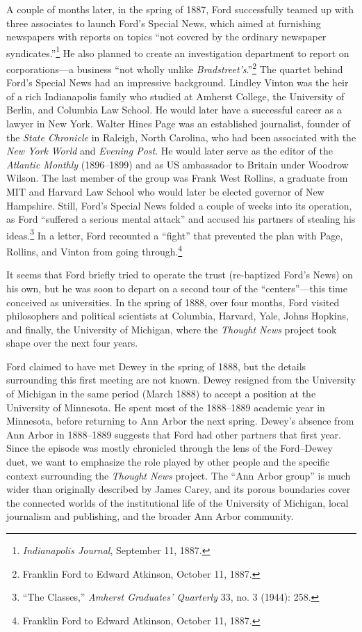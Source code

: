 \documentclass[openany,nobib]{tufte-book}
\begin{document}
A couple of months later, in the spring of 1887, Ford successfully
teamed up with three associates to launch Ford's Special News, which
aimed at furnishing newspapers with reports on topics ``not covered by
the ordinary newspaper syndicates.''\footnote{\emph{Indianapolis
  Journal}, September 11, 1887.} He also planned to create an
investigation department to report on corporations---a business ``not
wholly unlike \emph{Bradstreet's}.''\footnote{Franklin Ford to Edward
  Atkinson, October 11, 1887.} The quartet behind Ford's Special News
had an impressive background. Lindley Vinton was the heir of a rich
Indianapolis family who studied at Amherst College, the University of
Berlin, and Columbia Law School. He would later have a successful career
as a lawyer in New York. Walter Hines Page was an established
journalist, founder of the \emph{State Chronicle} in Raleigh, North
Carolina, who had been associated with the \emph{New York} \emph{World}
and \emph{Evening Post}. He would later serve as the editor of the
\emph{Atlantic Monthly} (1896--1899) and as US ambassador to Britain
under Woodrow Wilson. The last member of the group was Frank West
Rollins, a graduate from MIT and Harvard Law School who would later be
elected governor of New Hampshire. Still, Ford's Special News folded a
couple of weeks into its operation, as Ford ``suffered a serious mental
attack'' and accused his partners of stealing his ideas.\footnote{``The
  Classes,'' \emph{Amherst Graduates' Quarterly} 33, no. 3 (1944): 258.}
In a letter, Ford recounted a ``fight'' that prevented the plan with
Page, Rollins, and Vinton from going through.\footnote{Franklin Ford to
  Edward Atkinson, October 11, 1887.}

It seems that Ford briefly tried to operate the trust (re-baptized
Ford's News) on his own, but he was soon to depart on a second tour of
the ``centers''---this time conceived as universities. In the spring of
1888, over four months, Ford visited philosophers and political
scientists at Columbia, Harvard, Yale, Johns Hopkins, and finally, the
University of Michigan, where the \emph{Thought News} project took shape
over the next four years.

Ford claimed to have met Dewey in the spring of 1888, but the details
surrounding this first meeting are not known. Dewey resigned from the
University of Michigan in the same period (March 1888) to accept a
position at the University of Minnesota. He spent most of the 1888--1889
academic year in Minnesota, before returning to Ann Arbor the next
spring. Dewey's absence from Ann Arbor in 1888--1889 suggests that Ford
had other partners that first year. Since the episode was mostly
chronicled through the lens of the Ford­--Dewey duet, we want to
emphasize the role played by other people and the specific context
surrounding the \emph{Thought News} project. The ``Ann Arbor group'' is
much wider than originally described by James Carey, and its porous
boundaries cover the connected worlds of the institutional life of the
University of Michigan, local journalism and publishing, and the broader
Ann Arbor community.
\end{document}
